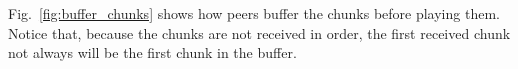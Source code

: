 \label{sec:buffer_chunks}

\begin{figure*}
   \caption{Buffering of the chunks.\label{fig:buffer_chunks}}
\end{figure*}

Fig.~\ref{fig:buffer_chunks} shows how peers buffer the chunks before
playing them. Notice that, because the chunks are not received in
order, the first received chunk not always will be the first chunk in
the buffer.
